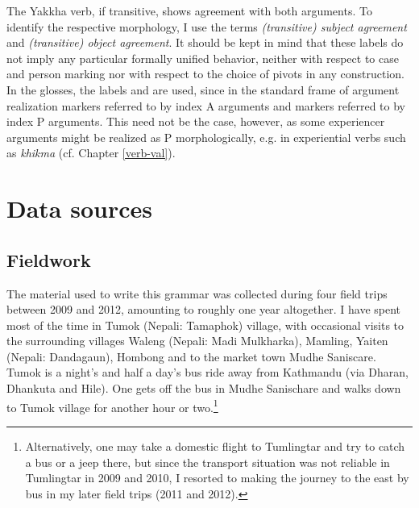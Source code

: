 The Yakkha verb, if transitive, shows agreement with both arguments. To identify the respective morphology, I use the terms \emph{(transitive) subject agreement}  and \emph{(transitive) object agreement}. It should be kept in mind that these labels do not imply any particular formally unified behavior, neither with respect to case and person marking nor with respect to the choice of pivots in any construction. In the glosses,  the labels  and  are used, since in the standard frame of argument realization markers referred to by  index A arguments and markers referred to by  index P arguments. This need not be the case, however, as some experiencer arguments might be realized as P morphologically, e.g. in experiential verbs such as \emph{khikma}  (cf. Chapter \ref{verb-val}).


\section{Data sources}\label{sources}

\subsection{Fieldwork}

The material used to write this grammar was collected during four field trips between 2009 and 2012, amounting to roughly one year altogether. I have spent most of the time in Tumok (Nepali: Tamaphok) village, with occasional visits to the surrounding villages Waleng (Nepali: Madi Mulkharka), Mamling, Yaiten (Nepali:  Dandagaun), Hombong and to the market town Mudhe Saniscare. Tumok is a night's and half a day's bus ride away from Kathmandu (via Dharan, Dhankuta and Hile). One gets off the bus in  Mudhe Sanischare and walks down to Tumok village for another hour or two.\footnote{Alternatively, one may take a domestic flight to Tumlingtar and try to catch a bus or a jeep there, but since the transport situation was not reliable in Tumlingtar in 2009 and 2010, I resorted to making the journey to the east by bus in my later field trips (2011 and 2012).}


